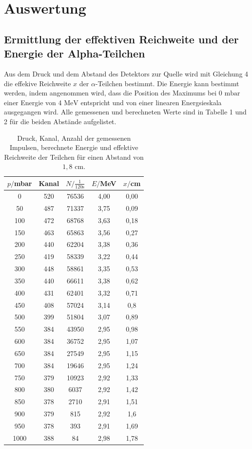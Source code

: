 \section{Auswertung}
\label{sec:Auswertung}

\subsection{Ermittlung der effektiven Reichweite und der Energie der Alpha-Teilchen}
Aus dem Druck und dem Abstand des Detektors zur Quelle wird mit Gleichung 4 die effekive Reichweite $x$ der $\alpha$-Teilchen bestimmt. 
Die Energie kann bestimmt werden, indem angenommen wird, dass die Position des Maximums bei $0$ $\si{\milli\bar}$ einer Energie von 4 $\si{\MeV}$ entspricht und von einer linearen Energsieskala ausgegangen wird.
Alle gemessenen und berechneten Werte sind in Tabelle 1 und 2 für die beiden Abstände aufgelistet.


\begin{table}[H]
  \centering
  \caption{Druck, Kanal, Anzahl der gemessenen Impulsen, berechnete Energie und effektive Reichweite der Teilchen für einen Abstand von $1,8$ $\si{\cm}$.}
  \label{tab:Parameter}
  \begin{tabular}{c c c c c}
    \toprule
    $p/$mbar& Kanal & $N/\frac{1}{120\si{\second}}$ & $E/$MeV & $x/$cm \\
    \bottomrule
    0 & 520 & 76536 & 4,00 & 0,00 \\
    50 & 487 & 71337 & 3,75 & 0,09 \\
    100 & 472 & 68768 & 3,63 & 0,18 \\
    150 & 463 & 65863 & 3,56 & 0,27 \\
    200 & 440 & 62204 & 3,38 & 0,36 \\
    250 & 419 & 58339 & 3,22 & 0,44 \\
    300 & 448 & 58861 & 3,35 & 0,53 \\
    350 & 440 & 66611 & 3,38 & 0,62 \\
    400 & 431 & 62401 & 3,32 & 0,71 \\
    450 & 408 & 57024 & 3,14 & 0,8 \\
    500 & 399 & 51804 & 3,07 & 0,89 \\
    550 & 384 & 43950 & 2,95 & 0,98 \\
    600 & 384 & 36752 & 2,95 & 1,07 \\
    650 & 384 & 27549 & 2,95 & 1,15 \\
    700 & 384 & 19646 & 2,95 & 1,24 \\
    750 & 379 & 10923 & 2,92 & 1,33 \\
    800 & 380 & 6037 & 2,92 & 1,42 \\
    850 & 378 & 2710 & 2,91 & 1,51 \\
    900 & 379 & 815 & 2,92 & 1,6 \\
    950 & 378 & 393 & 2,91 & 1,69 \\
    1000 & 388 & 84 & 2,98 & 1,78 \\
 
     \bottomrule
  \end{tabular}
\end{table}

